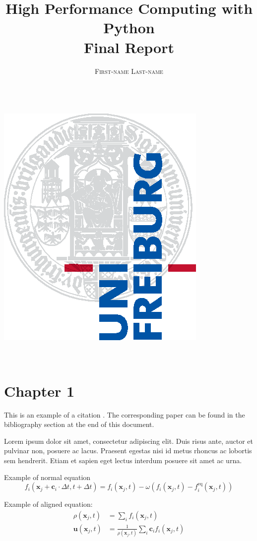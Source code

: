 \documentclass[a4paper,11pt]{report}
\title{\Huge \textbf{High Performance Computing with Python} \vspace{4mm} \\ \huge Final Report}
\author{\textsc{First-name Last-name} \\ \vspace{3mm}\text{matriculation number}  \\
\vspace{3mm}\text{email-address}}
\begin{document}
\makeatletter
    \begin{titlepage}
        \begin{center}
            \includegraphics[width=0.5\linewidth]{logos/Uni_Logo-Grundversion_E1_A4_CMYK.eps}\\[4ex]
            {\huge \bfseries  \@title }\\[2ex] 
            {\LARGE  \@author}\\[30ex] 
            {\large \@date}
        \end{center}
    \end{titlepage}
\makeatother
\thispagestyle{empty}
\newpage



\tableofcontents


\chapter{Chapter 1}

This is an example of a citation \cite{timm2016lattice}. The corresponding paper can be found in the bibliography section at the end of this document.

Lorem ipsum dolor sit amet, consectetur adipiscing elit. Duis risus ante, auctor et pulvinar non, posuere ac lacus. Praesent egestas nisi id metus rhoncus ac lobortis sem hendrerit. Etiam et sapien eget lectus interdum posuere sit amet ac urna.

Example of normal equation
\begin{equation}\label{eq:LBE}
f_i(\mathbf{x}_j+\mathbf{c}_i\cdot\Delta t,t+\Delta t)=f_i(\mathbf{x}_j,t)
-\omega \left( f_i(\mathbf{x}_j,t)-f_i^\text{eq}(\mathbf{x}_j,t) \right)
\end{equation}

Example of aligned equation:
\begin{align}
  \rho(\mathbf{x}_j, t) &= \sum_i f_i(\mathbf{x}_j, t) \\
  \mathbf{u}(\mathbf{x}_j, t) &= \frac{1}{ \rho(\mathbf{x}_j, t)}
    \sum_i \mathbf{c}_i f_i(\mathbf{x}_j, t)
\end{align}
\end{document}
